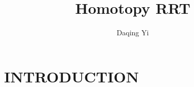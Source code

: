 \documentclass[letterpaper, 10 pt, conference]{ieeeconf}
\title{\LARGE \bf
Homotopy RRT
}
\author{
Daqing Yi
}
\begin{document}
\maketitle
\thispagestyle{empty}
\pagestyle{empty}


\begin{abstract}



\end{abstract}


\section{INTRODUCTION}



\end{document}

